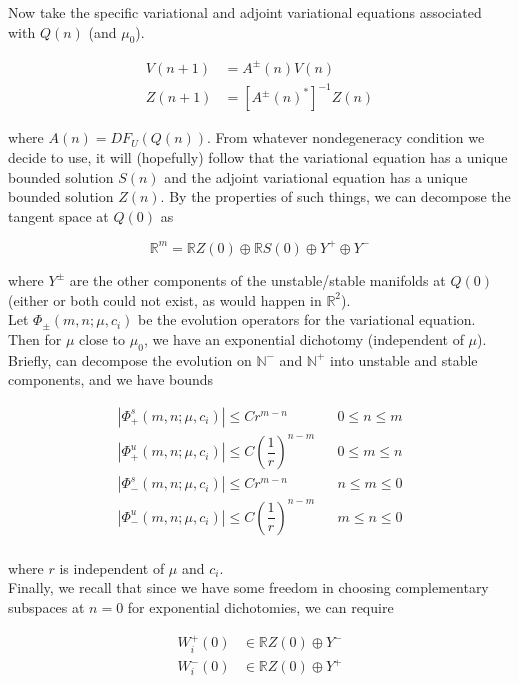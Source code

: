 \documentclass[12pt]{article}
\def\R{{\mathbb R}}
\def\N{{\mathbb N}}
\begin{document}
Now take the specific variational and adjoint variational equations associated with $Q(n)$ (and $\mu_0$).

\begin{align}
V(n+1) &= A^\pm(n) V(n) \label{vareqQ} \\
Z(n+1) &= [A^\pm(n)^*]^{-1} Z(n) \label{adjvareqQ}
\end{align}

where $A(n) = DF_{U}(Q(n))$. From whatever nondegeneracy condition we decide to use, it will (hopefully) follow that the variational equation has a unique bounded solution $S(n)$ and the adjoint variational equation has a unique bounded solution $Z(n)$. By the properties of such things, we can decompose the tangent space at $Q(0)$ as

\[
\R^m = \R Z(0) \oplus \R S(0) \oplus Y^+ \oplus Y^-
\]

where $Y^\pm$ are the other components of the unstable/stable manifolds at $Q(0)$ (either or both could not exist, as would happen in $\R^2$).\\

Let $\Phi_\pm(m, n; \mu, c_i)$ be the evolution operators for the variational equation. Then for $\mu$ close to $\mu_0$, we have an exponential dichotomy (independent of $\mu$). Briefly, can decompose the evolution on $\N^-$ and $\N^+$ into unstable and stable components, and we have bounds

\begin{align*}
|\Phi_+^s(m, n; \mu, c_i)| \leq C r^{m - n} && 0 \leq n \leq m \\
|\Phi_+^u(m, n; \mu, c_i)| \leq C \left( \dfrac{1}{r} \right)^{n-m} && 0 \leq m \leq n \\
|\Phi_-^s(m, n; \mu, c_i)| \leq C r^{m - n} && n \leq m \leq 0 \\
|\Phi_-^u(m, n; \mu, c_i)| \leq C \left( \dfrac{1}{r} \right)^{n-m} && m \leq n \leq 0\\
\end{align*}

where $r$ is independent of $\mu$ and $c_i$. \\

Finally, we recall that since we have some freedom in choosing complementary subspaces at $n = 0$ for exponential dichotomies, we can require

\begin{align*}
W_i^+(0) &\in \R Z(0) \oplus Y^- \\
W_i^-(0) &\in \R Z(0) \oplus Y^+
\end{align*}
\end{document}
